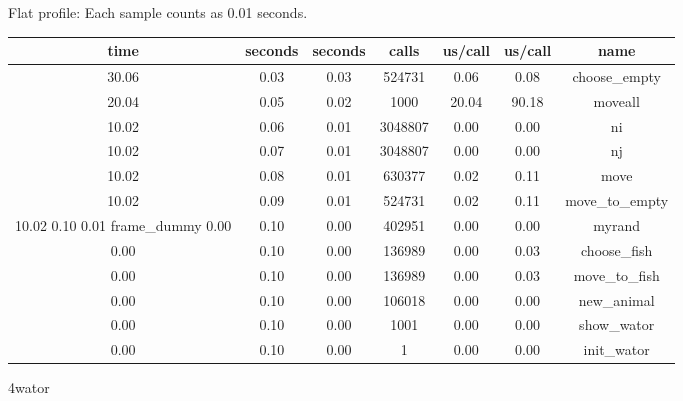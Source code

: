 \documentclass[a4paper,10pt]{article}
\begin{document}
Flat profile:
Each sample counts as 0.01 seconds.
\begin{center}
  \begin{tabular}{| c | c | c | c | c | c | c |}
    \hline
 time &   seconds &   seconds &    calls &  us/call &   us/call &   name \\ \hline    
 30.06 &      0.03 &     0.03 &   524731 &     0.06 &      0.08 &   choose\_empty \\ \hline
 20.04 &      0.05 &     0.02 &     1000 &    20.04 &     90.18 &   moveall \\ \hline
 10.02 &      0.06 &     0.01 &  3048807 &     0.00 &      0.00 &   ni \\ \hline
 10.02 &      0.07 &     0.01 &  3048807 &     0.00 &      0.00 &   nj \\ \hline
 10.02 &      0.08 &     0.01 &   630377 &     0.02 &      0.11 &   move \\ \hline
 10.02 &      0.09 &     0.01 &   524731 &     0.02 &      0.11 &   move\_to\_empty \\ \hline
 10.02      0.10     0.01                             frame\_dummy
  0.00 &      0.10 &     0.00 &   402951 &     0.00 &      0.00 &   myrand \\ \hline
  0.00 &      0.10 &     0.00 &   136989 &     0.00 &      0.03 &   choose\_fish \\ \hline
  0.00 &      0.10 &     0.00 &   136989 &     0.00 &      0.03 &   move\_to\_fish \\ \hline
  0.00 &      0.10 &     0.00 &   106018 &     0.00 &      0.00 &   new\_animal \\ \hline
  0.00 &      0.10 &     0.00 &     1001 &     0.00 &      0.00 &   show\_wator \\ \hline
  0.00 &      0.10 &     0.00 &        1 &     0.00 &      0.00 &   init\_wator \\ \hline
  \end{tabular}
\end{center}
  
  4wator
\end{document}
